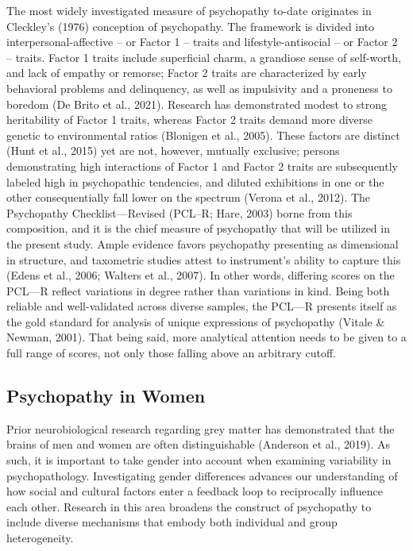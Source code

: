 \documentclass[
  man,floatsintext]{apa7}
\begin{document}
The most widely investigated measure of psychopathy to-date originates in Cleckley's (1976) conception of psychopathy. The framework is divided into interpersonal-affective -- or Factor 1 -- traits and lifestyle-antisocial -- or Factor 2 -- traits. Factor 1 traits include superficial charm, a grandiose sense of self-worth, and lack of empathy or remorse; Factor 2 traits are characterized by early behavioral problems and delinquency, as well as impulsivity and a proneness to boredom (De Brito et al., 2021). Research has demonstrated modest to strong heritability of Factor 1 traits, whereas Factor 2 traits demand more diverse genetic to environmental ratios (Blonigen et al., 2005). These factors are distinct (Hunt et al., 2015) yet are not, however, mutually exclusive; persons demonstrating high interactions of Factor 1 and Factor 2 traits are subsequently labeled high in psychopathic tendencies, and diluted exhibitions in one or the other consequentially fall lower on the spectrum (Verona et al., 2012). The Psychopathy Checklist---Revised (PCL--R; Hare, 2003) borne from this composition, and it is the chief measure of psychopathy that will be utilized in the present study. Ample evidence favors psychopathy presenting as dimensional in structure, and taxometric studies attest to instrument's ability to capture this (Edens et al., 2006; Walters et al., 2007). In other words, differing scores on the PCL---R reflect variations in degree rather than variations in kind. Being both reliable and well-validated across diverse samples, the PCL---R presents itself as the gold standard for analysis of unique expressions of psychopathy (Vitale \& Newman, 2001). That being said, more analytical attention needs to be given to a full range of scores, not only those falling above an arbitrary cutoff.

\hypertarget{psychopathy-in-women}{%
\subsection{Psychopathy in Women}\label{psychopathy-in-women}}

Prior neurobiological research regarding grey matter has demonstrated that the brains of men and women are often distinguishable (Anderson et al., 2019). As such, it is important to take gender into account when examining variability in psychopathology. Investigating gender differences advances our understanding of how social and cultural factors enter a feedback loop to reciprocally influence each other. Research in this area broadens the construct of psychopathy to include diverse mechanisms that embody both individual and group heterogeneity.
\end{document}
